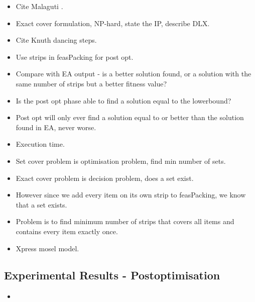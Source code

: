 \documentclass{elsarticle}
\begin{document}
{\color{myGreen}
\begin{itemize}[leftmargin=*]
	\item Cite Malaguti \cite{malaguti2008}.
	\item Exact cover formulation, NP-hard, state the IP, describe DLX.
	\item Cite Knuth \cite{knuth2000} dancing steps.
	\item Use strips in feasPacking for post opt.
	\item Compare with EA output - is a better solution found, or a solution with the same number of strips but a better fitness value?
	\item Is the post opt phase able to find a solution equal to the lowerbound?
	\item Post opt will only ever find a solution equal to or better than the solution found in EA, never worse.
	\item Execution time.
	\item Set cover problem is optimisation problem, find min number of sets.
	\item Exact cover problem is decision problem, does a set exist.
	\item However since we add every item on its own strip to feasPacking, we know that a set exists.
	\item Problem is to find minimum number of strips that covers all items and contains every item exactly once.
	\item Xpress mosel model.
\end{itemize}
}

\subsection{Experimental Results - Postoptimisation}
\label{sub:exppostopt}

{\color{myGreen}
\begin{itemize}[leftmargin=*]
	\item
\end{itemize}
}
\end{document}
